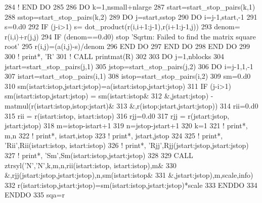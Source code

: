 \begin{DoxyCode}
284     \textcolor{comment}{! END DO}
285     
286     \textcolor{keywordflow}{DO} k=1,nsmall+nlarge
287        start=start\_stop\_pairs(k,1)
288        sstop=start\_stop\_pairs(k,2)
289        \textcolor{keywordflow}{DO} j=start,sstop
290           \textcolor{keywordflow}{DO} i=j-1,start,-1
291              s=0.d0
292              \textcolor{keywordflow}{IF} (j-i>1) s= dot\_product(r(i,i+1:j-1),r(i+1:j-1,j))
293              denom= r(i,i)+r(j,j)
294              \textcolor{keywordflow}{IF} (denom==0.d0) stop \textcolor{stringliteral}{'Sqrtm: Failed to find the matrix square root'}
295              r(i,j)=(a(i,j)-s)/denom
296 \textcolor{keywordflow}{          END DO}
297 \textcolor{keywordflow}{       END DO}
298 \textcolor{keywordflow}{    END DO}
299 
300     \textcolor{comment}{! print*, 'R'}
301     \textcolor{comment}{! CALL printmat(R)}
302     
303     \textcolor{keywordflow}{DO} j=1,nblocks
304        jstart=start\_stop\_pairs(j,1)
305        jstop=start\_stop\_pairs(j,2)
306        \textcolor{keywordflow}{DO} i=j-1,1,-1
307           istart=start\_stop\_pairs(i,1)
308           istop=start\_stop\_pairs(i,2)
309           sm=0.d0
310           sm(istart:istop,jstart:jstop)=a(istart:istop,jstart:jstop)
311           \textcolor{keywordflow}{IF} (j-i>1) sm(istart:istop,jstart:jstop) = sm(istart:istop&
312                &,jstart:jstop) - matmul(r(istart:istop,istop:jstart)&
313                &,r(istop:jstart,jstart:jstop))
314           rii=0.d0
315           rii = r(istart:istop, istart:istop)
316           rjj=0.d0
317           rjj = r(jstart:jstop, jstart:jstop)
318           m=istop-istart+1
319           n=jstop-jstart+1
320           k=1
321           \textcolor{comment}{! print*, m,n}
322           \textcolor{comment}{! print*, istart,istop}
323           \textcolor{comment}{! print*, jstart,jstop}
324 
325           \textcolor{comment}{! print*, 'Rii',Rii(istart:istop, istart:istop)}
326           \textcolor{comment}{! print*, 'Rjj',Rjj(jstart:jstop,jstart:jstop)}
327           \textcolor{comment}{! print*, 'Sm',Sm(istart:istop,jstart:jstop)}
328 
329           \textcolor{keyword}{CALL }ztrsyl(\textcolor{stringliteral}{'N'},\textcolor{stringliteral}{'N'},k,m,n,rii(istart:istop, istart:istop),m&
330                &,rjj(jstart:jstop,jstart:jstop),n,sm(istart:istop&
331                &,jstart:jstop),m,scale,info)
332           r(istart:istop,jstart:jstop)=sm(istart:istop,jstart:jstop)*scale
333 \textcolor{keywordflow}{       ENDDO}
334 \textcolor{keywordflow}{    ENDDO}
335     sqa=r
\end{DoxyCode}

